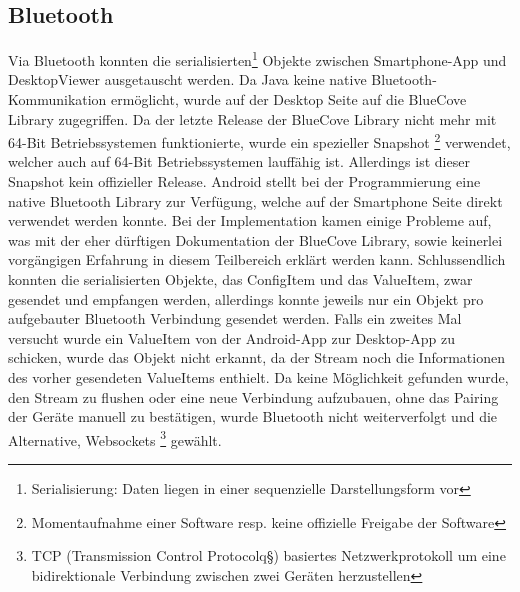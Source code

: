 \subsection{Bluetooth}
Via Bluetooth konnten die serialisierten\footnote{Serialisierung: Daten liegen in einer sequenzielle Darstellungsform vor} 
Objekte zwischen Smartphone-App und DesktopViewer ausgetauscht werden. 
Da Java keine native Bluetooth-Kommunikation ermöglicht, wurde auf der 
Desktop Seite auf die BlueCove Library \cite{Inf:Bluecove} zugegriffen. Da der letzte Release der 
BlueCove Library nicht mehr mit 64-Bit Betriebssystemen funktionierte, wurde ein spezieller Snapshot 
\footnote{Momentaufnahme einer Software resp. keine offizielle Freigabe der Software} 
verwendet, welcher auch auf 64-Bit Betriebssystemen lauffähig ist. Allerdings ist dieser Snapshot 
kein offizieller Release.
Android stellt bei der Programmierung eine native Bluetooth 
Library zur Verfügung, welche auf der Smartphone Seite direkt verwendet werden konnte. 
Bei der Implementation kamen einige Probleme auf, was mit der eher dürftigen 
Dokumentation der BlueCove Library, sowie keinerlei vorgängigen Erfahrung in diesem Teilbereich 
erklärt werden kann. Schlussendlich konnten die serialisierten Objekte, das ConfigItem 
und das ValueItem, zwar gesendet und empfangen werden, allerdings konnte jeweils nur ein Objekt pro aufgebauter 
Bluetooth Verbindung gesendet werden. Falls ein zweites Mal versucht wurde ein ValueItem von der 
Android-App zur Desktop-App zu schicken, wurde das Objekt nicht erkannt, da der 
Stream noch die Informationen des vorher gesendeten ValueItems enthielt. 
Da keine Möglichkeit gefunden wurde, den Stream zu flushen oder eine neue 
Verbindung aufzubauen, ohne das Pairing der Geräte manuell zu bestätigen, wurde Bluetooth 
nicht weiterverfolgt und die Alternative, Websockets \footnote{TCP (Transmission Control Protocolq§) basiertes Netzwerkprotokoll 
um eine bidirektionale Verbindung zwischen zwei Geräten herzustellen} gewählt. 

            
